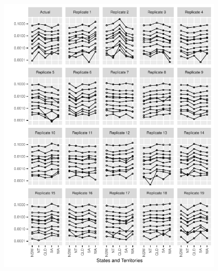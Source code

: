 \documentclass{article}
\begin{document}
\begin{figure}
  \centering
  \includegraphics{out/fig_replicate_data_Female_Indigenous_Baseline}
\end{figure}
\newpage
\end{document}

